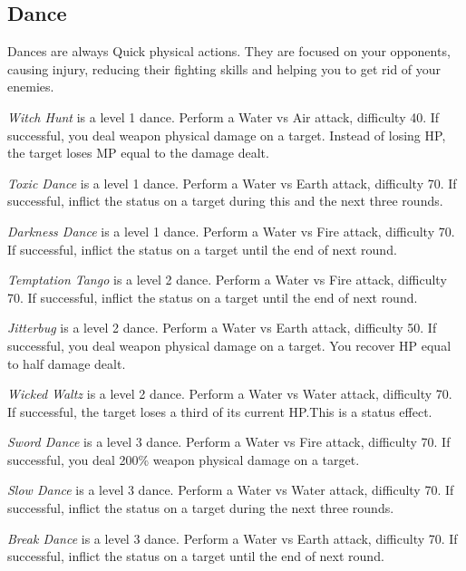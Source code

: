 \begin{multicols}{2}

    \subsection{Dance}\label{subsec:perf-dance}
    
    Dances are always Quick physical actions. They are focused on your opponents, causing injury, reducing their fighting skills and helping you to get rid of your enemies.
    
    \textit{Witch Hunt} is a level 1 dance. Perform a Water vs Air attack, difficulty 40. If successful, you deal weapon physical damage on a target. Instead of losing HP, the target loses MP equal to the damage dealt.
    
    \textit{Toxic Dance} is a level 1 dance. Perform a Water vs Earth attack, difficulty 70. If successful, inflict the  status on a target during this and the next three rounds.

    \textit{Darkness Dance} is a level 1 dance. Perform a Water vs Fire attack, difficulty 70. If successful, inflict the  status on a target until the end of next round.
    
    \textit{Temptation Tango} is a level 2 dance. Perform a Water vs Fire attack, difficulty 70. If successful, inflict the  status on a target until the end of next round.
    
    \textit{Jitterbug} is a level 2 dance. Perform a Water vs Earth attack, difficulty 50. If successful, you deal weapon physical damage on a target. You recover HP equal to half damage dealt.
    
    \textit{Wicked Waltz} is a level 2 dance. Perform a Water vs Water attack, difficulty 70. If successful, the target loses a third of its current HP.\@{}This is a  status effect.
    
    \textit{Sword Dance} is a level 3 dance. Perform a Water vs Fire attack, difficulty 70. If successful, you deal 200\% weapon physical damage on a target.
    
    \textit{Slow Dance} is a level 3 dance. Perform a Water vs Water attack, difficulty 70. If successful, inflict the  status on a target during the next three rounds.
    
    \textit{Break Dance} is a level 3 dance. Perform a Water vs Earth attack, difficulty 70. If successful, inflict the  status on a target until the end of next round.
    

\end{multicols}

